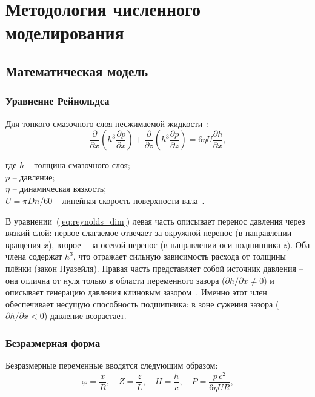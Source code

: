 \section{Методология численного моделирования}

\subsection{Математическая модель}

\subsubsection{Уравнение Рейнольдса}

Для тонкого смазочного слоя несжимаемой жидкости~\cite{pinkus, hamrock}:
\begin{equation}
    \frac{\partial}{\partial x}\!\left(h^3 \frac{\partial p}{\partial x}\right) + \frac{\partial}{\partial z}\!\left(h^3 \frac{\partial p}{\partial z}\right) = 6\eta U \frac{\partial h}{\partial x},
    \label{eq:reynolds_dim}
\end{equation}

\noindent где $h$ -- толщина смазочного слоя;\\
\hphantom{где }$p$ -- давление;\\
\hphantom{где }$\eta$ -- динамическая вязкость;\\
\hphantom{где }$U = \pi D n / 60$ -- линейная скорость поверхности вала~\cite{pinkus}.

В уравнении~(\ref{eq:reynolds_dim}) левая часть описывает перенос давления через вязкий слой: первое слагаемое отвечает за окружной перенос (в направлении вращения $x$), второе -- за осевой перенос (в направлении оси подшипника $z$). Оба члена содержат $h^3$, что отражает сильную зависимость расхода от толщины плёнки (закон Пуазейля). Правая часть представляет собой источник давления -- она отлична от нуля только в области переменного зазора ($\partial h / \partial x \neq 0$) и описывает генерацию давления клиновым зазором~\cite{hamrock}. Именно этот член обеспечивает несущую способность подшипника: в зоне сужения зазора ($\partial h / \partial x < 0$) давление возрастает.

\subsubsection{Безразмерная форма}

Безразмерные переменные вводятся следующим образом:
\begin{equation}
    \varphi = \frac{x}{R}, \quad Z = \frac{z}{L}, \quad H = \frac{h}{c}, \quad P = \frac{p\,c^2}{6\eta U R},
    \label{eq:ndim_vars}
\end{equation}

